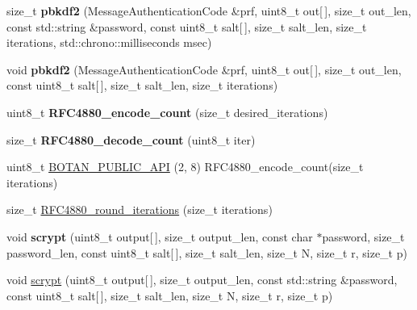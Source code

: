 \begin{DoxyCompactItemize}
\item 
\mbox{\label{namespace_botan_a7f528f347ada25931bc355672b427b5b}} 
size\+\_\+t {\bfseries pbkdf2} (Message\+Authentication\+Code \&prf, uint8\+\_\+t out\mbox{[}$\,$\mbox{]}, size\+\_\+t out\+\_\+len, const std\+::string \&password, const uint8\+\_\+t salt\mbox{[}$\,$\mbox{]}, size\+\_\+t salt\+\_\+len, size\+\_\+t iterations, std\+::chrono\+::milliseconds msec)
\item 
\mbox{\label{namespace_botan_a63dcd18a2948fc87b0f1811dff14f627}} 
void {\bfseries pbkdf2} (Message\+Authentication\+Code \&prf, uint8\+\_\+t out\mbox{[}$\,$\mbox{]}, size\+\_\+t out\+\_\+len, const uint8\+\_\+t salt\mbox{[}$\,$\mbox{]}, size\+\_\+t salt\+\_\+len, size\+\_\+t iterations)
\item 
\mbox{\label{namespace_botan_a548b8da3169fa2bde2617477d7827f30}} 
uint8\+\_\+t {\bfseries R\+F\+C4880\+\_\+encode\+\_\+count} (size\+\_\+t desired\+\_\+iterations)
\item 
\mbox{\label{namespace_botan_a8dabb8ac0ebdcad5ce8d7da372ccb0be}} 
size\+\_\+t {\bfseries R\+F\+C4880\+\_\+decode\+\_\+count} (uint8\+\_\+t iter)
\item 
uint8\+\_\+t \mbox{\hyperlink{namespace_botan_ace7349411411e52a65630e3e607ed504}{B\+O\+T\+A\+N\+\_\+\+P\+U\+B\+L\+I\+C\+\_\+\+A\+PI}} (2, 8) R\+F\+C4880\+\_\+encode\+\_\+count(size\+\_\+t iterations)
\item 
size\+\_\+t \mbox{\hyperlink{namespace_botan_aebdcf273bc754092e425287b1cf05208}{R\+F\+C4880\+\_\+round\+\_\+iterations}} (size\+\_\+t iterations)
\item 
\mbox{\label{namespace_botan_a5e95bbc38635f4f5ab0be6c88797eb56}} 
void {\bfseries scrypt} (uint8\+\_\+t output\mbox{[}$\,$\mbox{]}, size\+\_\+t output\+\_\+len, const char $\ast$password, size\+\_\+t password\+\_\+len, const uint8\+\_\+t salt\mbox{[}$\,$\mbox{]}, size\+\_\+t salt\+\_\+len, size\+\_\+t N, size\+\_\+t r, size\+\_\+t p)
\item 
void \mbox{\hyperlink{namespace_botan_ae1b6ad71a73156fb774a71db9e99eb5a}{scrypt}} (uint8\+\_\+t output\mbox{[}$\,$\mbox{]}, size\+\_\+t output\+\_\+len, const std\+::string \&password, const uint8\+\_\+t salt\mbox{[}$\,$\mbox{]}, size\+\_\+t salt\+\_\+len, size\+\_\+t N, size\+\_\+t r, size\+\_\+t p)

\end{DoxyCompactItemize}
